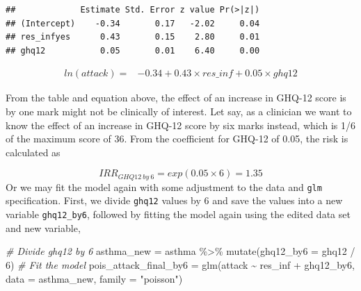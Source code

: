 \documentclass[
  10pt,
]{krantz}
\newenvironment{Shaded}{\begin{snugshade}}{\end{snugshade}}
\newcommand{\AttributeTok}[1]{\textcolor[rgb]{0.77,0.63,0.00}{#1}}
\newcommand{\CommentTok}[1]{\textcolor[rgb]{0.56,0.35,0.01}{\textit{#1}}}
\newcommand{\DecValTok}[1]{\textcolor[rgb]{0.00,0.00,0.81}{#1}}
\newcommand{\FunctionTok}[1]{\textcolor[rgb]{0.00,0.00,0.00}{#1}}
\newcommand{\NormalTok}[1]{#1}
\newcommand{\OtherTok}[1]{\textcolor[rgb]{0.56,0.35,0.01}{#1}}
\newcommand{\SpecialCharTok}[1]{\textcolor[rgb]{0.00,0.00,0.00}{#1}}
\newcommand{\StringTok}[1]{\textcolor[rgb]{0.31,0.60,0.02}{#1}}
\begin{document}
\begin{Shaded}
\end{Shaded}

\begin{verbatim}
##             Estimate Std. Error z value Pr(>|z|)
## (Intercept)    -0.34       0.17   -2.02     0.04
## res_infyes      0.43       0.15    2.80     0.01
## ghq12           0.05       0.01    6.40     0.00
\end{verbatim}

\[\begin{aligned}
ln(attack) = & -0.34 + 0.43\times res\_inf + 0.05\times ghq12
\end{aligned}\]

From the table and equation above, the effect of an increase in GHQ-12 score is by one mark might not be clinically of interest. Let say, as a clinician we want to know the effect of an increase in GHQ-12 score by six marks instead, which is 1/6 of the maximum score of 36. From the coefficient for GHQ-12 of 0.05, the risk is calculated as

\[IRR_{GHQ12\ by\ 6} = exp(0.05\times 6) = 1.35\]
Or we may fit the model again with some adjustment to the data and \texttt{glm} specification. First, we divide \texttt{ghq12} values by 6 and save the values into a new variable \texttt{ghq12\_by6}, followed by fitting the model again using the edited data set and new variable,

\begin{Shaded}
\begin{Highlighting}[]
\CommentTok{\# Divide ghq12 by 6}
\NormalTok{asthma\_new }\OtherTok{=}\NormalTok{ asthma }\SpecialCharTok{\%\textgreater{}\%} \FunctionTok{mutate}\NormalTok{(}\AttributeTok{ghq12\_by6 =}\NormalTok{ ghq12 }\SpecialCharTok{/} \DecValTok{6}\NormalTok{)}
\CommentTok{\# Fit the model}
\NormalTok{pois\_attack\_final\_by6 }\OtherTok{=} \FunctionTok{glm}\NormalTok{(attack }\SpecialCharTok{\textasciitilde{}}\NormalTok{ res\_inf }\SpecialCharTok{+}\NormalTok{ ghq12\_by6, }
                            \AttributeTok{data =}\NormalTok{ asthma\_new, }\AttributeTok{family =} \StringTok{"poisson"}\NormalTok{)}
\end{Highlighting}
\end{Shaded}
\end{document}
